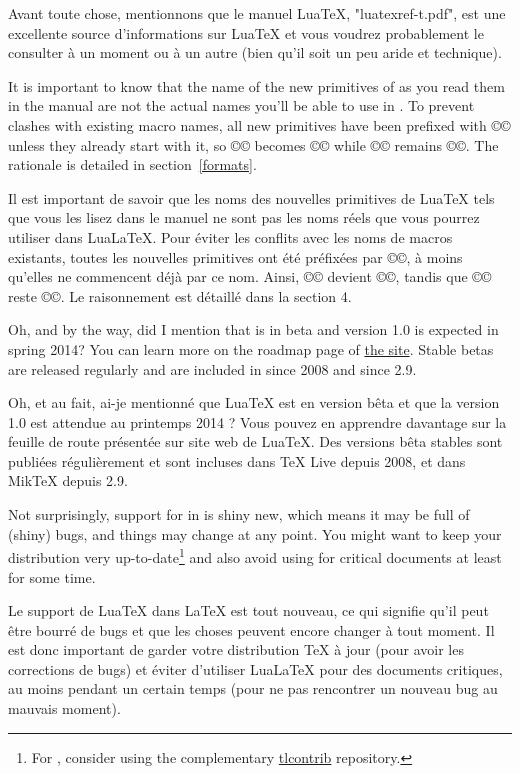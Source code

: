 \documentclass{lltxdoc}
\begin{document}
Avant toute chose, mentionnons que le manuel LuaTeX, "luatexref-t.pdf", est une excellente source d'informations sur LuaTeX et vous voudrez probablement le consulter à un moment ou à un autre (bien qu'il soit un peu aride et technique).

It is important to know that the name of the new primitives of \luatex as you
read them in the manual are not the actual names you'll be able to use in
\lualatex. To prevent clashes with existing macro names, all new primitives
have been prefixed with ©\luatex© unless they already start with it, so
©\luaescapestring© becomes ©\luatexluaescapetring© while ©\luatexversion©
remains ©\luatexversion©. The rationale is detailed in section~\ref{formats}.

Il est important de savoir que les noms des nouvelles primitives de LuaTeX tels que vous les lisez dans le manuel ne sont pas les noms réels que vous pourrez utiliser dans LuaLaTeX. Pour éviter les conflits avec les noms de macros existants, toutes les nouvelles primitives ont été préfixées par ©\luatex©, à moins qu'elles ne commencent déjà par ce nom. Ainsi, ©\luaescapestring© devient ©\luatexluaescapetring©, tandis que ©\luatexversion© reste ©\luatexversion©. Le raisonnement est détaillé dans la section 4.

\medskip

Oh, and by the way, did I mention that \luatex is in beta and version 1.0 is
expected in spring 2014? You can learn more on the roadmap page of
\href{http://luatex.org/}{the \luatex site}. Stable betas are released
regularly and are included in \texlive since 2008 and \miktex since 2.9.

Oh, et au fait, ai-je mentionné que LuaTeX est en version bêta et que la version 1.0 est attendue au printemps 2014 ? Vous pouvez en apprendre davantage sur la feuille de route présentée sur site web de LuaTeX. Des versions bêta stables sont publiées régulièrement et sont incluses dans TeX Live depuis 2008, et dans MikTeX depuis 2.9.

Not surprisingly, support for \luatex in \latex is shiny new, which means it
may be full of (shiny) bugs, and things may change at any point. You might
want to keep your \tex distribution very up-to-date\footnote{For \texlive,
  consider using the complementary
  \href{http://tlcontrib.metatex.org/} {tlcontrib} repository.} and also avoid
using \lualatex for critical documents at least for some time.

Le support de LuaTeX dans LaTeX est tout nouveau, ce qui signifie qu'il peut être bourré de bugs et que les choses peuvent encore changer à tout moment. Il est donc important de garder votre distribution TeX à jour (pour avoir les corrections de bugs) et éviter d'utiliser LuaLaTeX pour des documents critiques, au moins pendant un certain temps (pour ne pas rencontrer un nouveau bug au mauvais moment).
\end{document}

